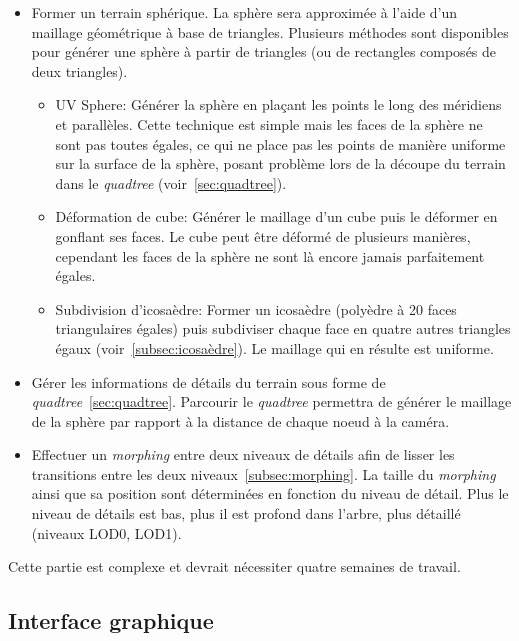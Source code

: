 \begin{itemize}
\item 
  Former un terrain sphérique. La sphère sera approximée à l'aide d'un
    maillage géométrique à base de triangles. Plusieurs méthodes sont
    disponibles pour générer une sphère à partir de triangles (ou de
    rectangles composés de deux triangles).
  \begin{itemize}
  \item
    UV Sphere: Générer la sphère en plaçant les points le long des
      méridiens et parallèles. Cette technique est simple mais les faces
      de la sphère ne sont pas toutes égales, ce qui ne place pas les
      points de manière uniforme sur la surface de la sphère, posant
      problème lors de la découpe du terrain dans le \emph{quadtree}
      (voir~\ref{sec:quadtree}).
  \item
    Déformation de cube: Générer le maillage d'un cube puis le déformer en
      gonflant ses faces. Le cube peut être déformé de plusieurs manières,
      cependant les faces de la sphère ne sont là encore jamais
      parfaitement égales.
  \item
    Subdivision d'icosaèdre: Former un icosaèdre (polyèdre à 20 faces
      triangulaires égales) puis subdiviser chaque face en quatre autres
      triangles égaux (voir~\ref{subsec:icosaèdre}). Le maillage qui en
      résulte est uniforme.
  \end{itemize}

\item
  Gérer les informations de détails du terrain sous forme de
    \emph{quadtree}~\ref{sec:quadtree}. Parcourir le \emph{quadtree} permettra de
    générer le maillage de la sphère par rapport à la distance de chaque
    noeud à la caméra.
\item
  Effectuer un \emph{morphing} entre deux niveaux de détails afin de
    lisser les transitions entre les deux niveaux~\ref{subsec:morphing}. La
    taille du \emph{morphing} ainsi que sa position sont déterminées en
    fonction du niveau de détail. Plus le niveau de détails est bas, plus il est profond dans l'arbre, plus détaillé (niveaux LOD0, LOD1).
\end{itemize}

Cette partie est complexe et devrait nécessiter quatre semaines de travail.

\subsection{Interface graphique}\label{interface-graphique}

